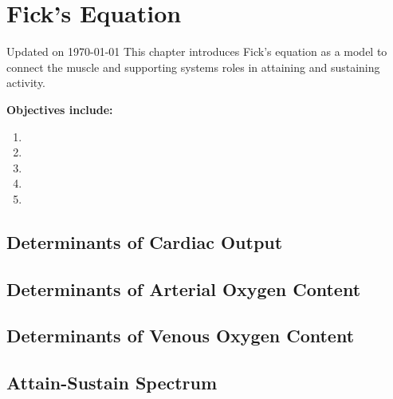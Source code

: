 \chapter{Fick's Equation}\label{chp:fick_equation}
Updated on \today
\minitoc
This chapter introduces Fick's equation as a model to connect the muscle and supporting systems roles in attaining and sustaining activity.

\vspace{5mm}

\textbf{Objectives include:}
\begin{enumerate}
    \item
    \item
    \item
    \item
    \item
\end{enumerate}

\section{Determinants of Cardiac Output}

\section{Determinants of Arterial Oxygen Content}

\section{Determinants of Venous Oxygen Content}

\section{Attain-Sustain Spectrum}

\printbibliography[heading=subbibintoc]